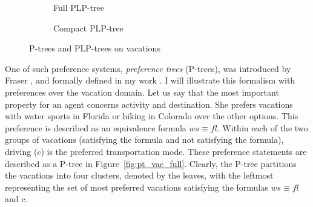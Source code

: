 \documentclass[11pt]{article}
\newcommand{\figref}[1]{Figure~\ref{fig:#1}}
\begin{document}
\begin{figure}[!ht]
\begin{subfigure}[b]{0.35\textwidth}
					\vspace{-1cm}
					\caption{\scriptsize Full PLP-tree \label{fig:plpt-full}}
				\end{subfigure}%
				\begin{subfigure}[b]{0.25\textwidth}
          \centering
					\vspace{0.1cm}
					\caption{\scriptsize Compact PLP-tree \label{fig:plpt-col}}
				\end{subfigure}
  \caption{P-trees and PLP-trees on vacations}
  \label{fig:pt_vac}
\vspace{-0.3cm}
\end{figure} 
One of such preference systems, \textit{preference trees} (P-trees), was
introduced by Fraser \cite{fraser1994}, and formally defined in my work \cite{wsh/mpref14/LiuT,LiuT:PT}.
I will illustrate this formalism with preferences over the vacation domain.
Let us say that the most important property for an agent concerns activity and destination.
She prefers vacations with water sports
in Florida or hiking in Colorado over the other options. This
preference is described as an equivalence formula $ws \equiv fl$.
Within each of the two groups of vacations (satisfying the
formula and not satisfying the formula), driving ($c$) is the preferred transportation mode.
These preference statements are described as a P-tree in \figref{pt_vac_full}.
Clearly, the P-tree partitions the vacations into four clusters, denoted by
the leaves, with the leftmost representing the set of most preferred vacations
satisfying the formulas $ws \equiv fl$ and $c$.
\end{document}
